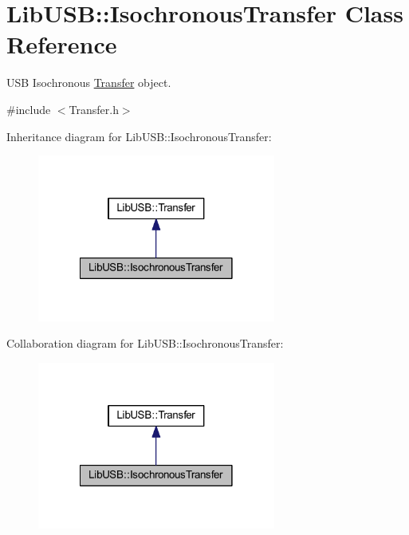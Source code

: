 \hypertarget{class_lib_u_s_b_1_1_isochronous_transfer}{\section{Lib\-U\-S\-B\-:\-:Isochronous\-Transfer Class Reference}
\label{class_lib_u_s_b_1_1_isochronous_transfer}
}


U\-S\-B Isochronous \hyperlink{class_lib_u_s_b_1_1_transfer}{Transfer} object.  




{\ttfamily \#include $<$Transfer.\-h$>$}



Inheritance diagram for Lib\-U\-S\-B\-:\-:Isochronous\-Transfer\-:\nopagebreak
\begin{figure}[H]
\begin{center}
\leavevmode
\includegraphics[width=222pt]{class_lib_u_s_b_1_1_isochronous_transfer__inherit__graph}
\end{center}
\end{figure}


Collaboration diagram for Lib\-U\-S\-B\-:\-:Isochronous\-Transfer\-:\nopagebreak
\begin{figure}[H]
\begin{center}
\leavevmode
\includegraphics[width=222pt]{class_lib_u_s_b_1_1_isochronous_transfer__coll__graph}
\end{center}
\end{figure}
